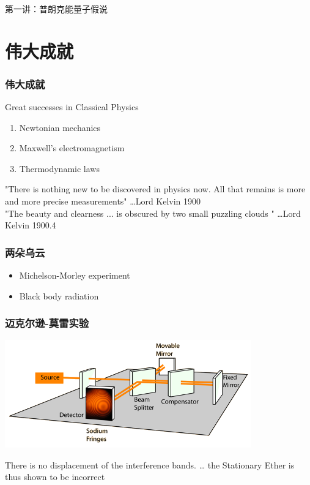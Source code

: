 \begin{frame}
    \frametitle{}
    \begin{center}
    { {\huge 第一讲：普朗克能量子假说 }}
    \end{center}    
\end{frame}

\section{伟大成就}

\begin{frame}
    \frametitle{伟大成就}
    Great successes in Classical Physics\\
        \begin{enumerate}
            \item Newtonian mechanics
            \item Maxwell's electromagnetism
            \item Thermodynamic laws
        \end{enumerate}
        "There is nothing new to be discovered in physics now. All that remains is 
        more and more precise measurements"   \ldots Lord Kelvin 1900 \\
        "The beauty and clearness ... is 
        obscured by two small puzzling clouds "  \ldots Lord Kelvin 1900.4
\end{frame}

\begin{frame}
    \frametitle{两朵乌云}
        \begin{itemize} 
            \item Michelson-Morley experiment
            \item Black body radiation
        \end{itemize}
\end{frame}

\begin{frame}
    \frametitle{迈克尔逊-莫雷实验}
    \begin{center}
    \includegraphics[width=0.8\textwidth]{figs/michel.png}
    \end{center}
There is no displacement of the interference bands. \dots 
the Stationary Ether is thus shown to be incorrect
\end{frame}

